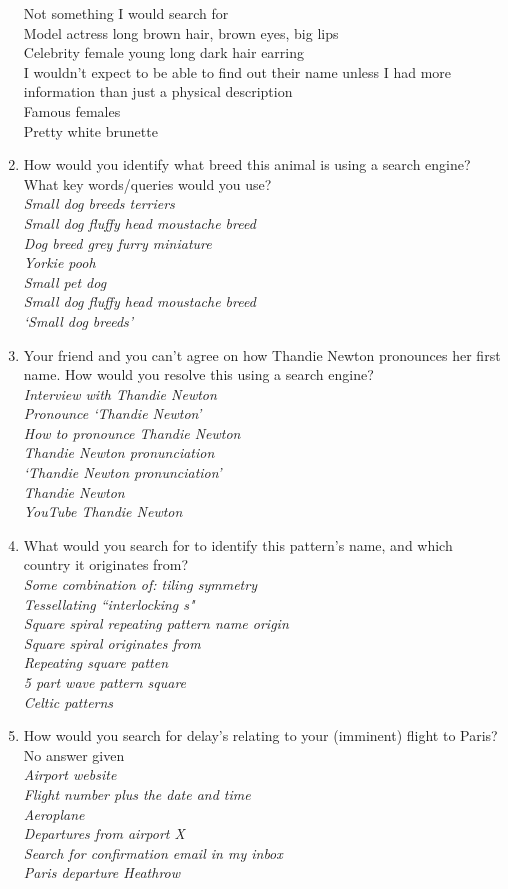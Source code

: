 \documentclass[a4paper, 11pt]{article}
\begin{document}
\begin{enumerate}
{{Not something I would search for\\
Model actress long brown hair, brown eyes, big lips\\
Celebrity female young long dark hair earring\\
I wouldn't expect to be able to find out their name unless I had more information than just a physical description\\
Famous females\\
Pretty white brunette \\}}
\item{How would you identify what breed this animal is using a search engine? What key words/queries would you use?\\\textit{Small dog breeds terriers\\
Small dog fluffy head moustache breed\\
Dog breed grey furry miniature\\
Yorkie pooh \\
Small pet dog\\
Small dog fluffy head moustache breed\\
`Small dog breeds' }}
\item{Your friend and you can't agree on how Thandie Newton pronounces her first name. How would you resolve this using a search engine?\\\textit{Interview with Thandie Newton\\
Pronounce `Thandie Newton'\\
How to pronounce Thandie Newton\\
Thandie Newton pronunciation\\
`Thandie Newton pronunciation'\\
Thandie Newton\\
YouTube Thandie Newton}}
\item{What would you search for to identify this pattern's name, and which country it originates from?\\\textit{Some combination of: tiling symmetry \\
Tessellating ``interlocking s"\\
Square spiral repeating pattern name origin\\
Square spiral originates from\\
Repeating square patten\\
5 part wave pattern square \\
Celtic patterns}}
\item{How would you search for delay's relating to your (imminent) flight to Paris?\\No answer given\\\textit{
Airport website\\
Flight number plus the date and time\\
Aeroplane\\
Departures from airport X\\
Search for confirmation email in my inbox\\
Paris departure Heathrow\\
}}
\end{enumerate}
\end{document}
